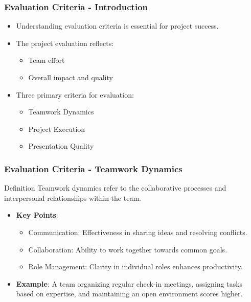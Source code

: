 \documentclass[aspectratio=169]{beamer}
\begin{document}
\begin{frame}[fragile]
    \frametitle{Evaluation Criteria - Introduction}
    \begin{itemize}
        \item Understanding evaluation criteria is essential for project success.
        \item The project evaluation reflects: 
        \begin{itemize}
            \item Team effort
            \item Overall impact and quality
        \end{itemize}
        \item Three primary criteria for evaluation:
        \begin{itemize}
            \item Teamwork Dynamics
            \item Project Execution
            \item Presentation Quality
        \end{itemize}
    \end{itemize}
\end{frame}

\begin{frame}[fragile]
    \frametitle{Evaluation Criteria - Teamwork Dynamics}
    \begin{block}{Definition}
        Teamwork dynamics refer to the collaborative processes and interpersonal relationships within the team.
    \end{block}
    
    \begin{itemize}
        \item \textbf{Key Points}:
        \begin{itemize}
            \item Communication: Effectiveness in sharing ideas and resolving conflicts.
            \item Collaboration: Ability to work together towards common goals.
            \item Role Management: Clarity in individual roles enhances productivity.
        \end{itemize}

        \item \textbf{Example}: 
        A team organizing regular check-in meetings, assigning tasks based on expertise, and maintaining an open environment scores higher.
    \end{itemize}
\end{frame}
\end{document}

